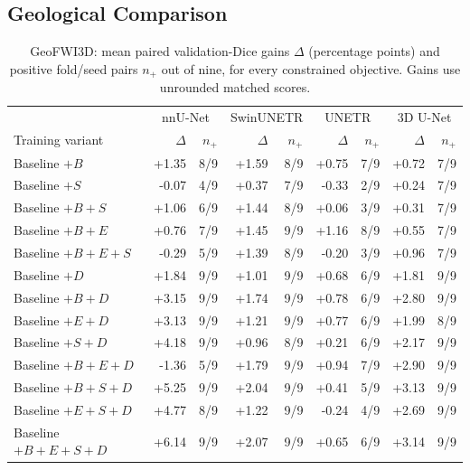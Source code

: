 \documentclass[12pt,a4paper]{article}
\begin{document}
\subsection{Geological Comparison}

\begin{table}[htbp]
\centering\small{}
\setlength{\tabcolsep}{4pt}
\renewcommand{\arraystretch}{1.12}
\begin{tabular}{@{}l*{4}{rr}@{}}
\hline
 & \multicolumn{2}{c}{nnU-Net} & \multicolumn{2}{c}{SwinUNETR} & \multicolumn{2}{c}{UNETR} & \multicolumn{2}{c}{3D U-Net} \\
Training variant & $\Delta$ & $n_+$ & $\Delta$ & $n_+$ & $\Delta$ & $n_+$ & $\Delta$ & $n_+$ \\
\hline
Baseline $+B$ & +1.35 & 8/9 & +1.59 & 8/9 & +0.75 & 7/9 & +0.72 & 7/9 \\
Baseline $+S$ & -0.07 & 4/9 & +0.37 & 7/9 & -0.33 & 2/9 & +0.24 & 7/9 \\
Baseline $+B+S$ & +1.06 & 6/9 & +1.44 & 8/9 & +0.06 & 3/9 & +0.31 & 7/9 \\
Baseline $+B+E$ & +0.76 & 7/9 & +1.45 & 9/9 & +1.16 & 8/9 & +0.55 & 7/9 \\
Baseline $+B+E+S$ & -0.29 & 5/9 & +1.39 & 8/9 & -0.20 & 3/9 & +0.96 & 7/9 \\
Baseline $+D$ & +1.84 & 9/9 & +1.01 & 9/9 & +0.68 & 6/9 & +1.81 & 9/9 \\
Baseline $+B+D$ & +3.15 & 9/9 & +1.74 & 9/9 & +0.78 & 6/9 & +2.80 & 9/9 \\
Baseline $+E+D$ & +3.13 & 9/9 & +1.21 & 9/9 & +0.77 & 6/9 & +1.99 & 8/9 \\
Baseline $+S+D$ & +4.18 & 9/9 & +0.96 & 8/9 & +0.21 & 6/9 & +2.17 & 9/9 \\
Baseline $+B+E+D$ & -1.36 & 5/9 & +1.79 & 9/9 & +0.94 & 7/9 & +2.90 & 9/9 \\
Baseline $+B+S+D$ & +5.25 & 9/9 & +2.04 & 9/9 & +0.41 & 5/9 & +3.13 & 9/9 \\
Baseline $+E+S+D$ & +4.77 & 8/9 & +1.22 & 9/9 & -0.24 & 4/9 & +2.69 & 9/9 \\
Baseline $+B+E+S+D$ & +6.14 & 9/9 & +2.07 & 9/9 & +0.65 & 6/9 & +3.14 & 9/9 \\
\hline
\end{tabular}
\caption{GeoFWI3D: mean paired validation-Dice gains $\Delta$
(percentage points) and positive fold/seed pairs $n_+$ out of nine,
for every constrained objective. Gains use unrounded matched scores.}
\label{tab:geo-ledger}
\end{table}
\end{document}
